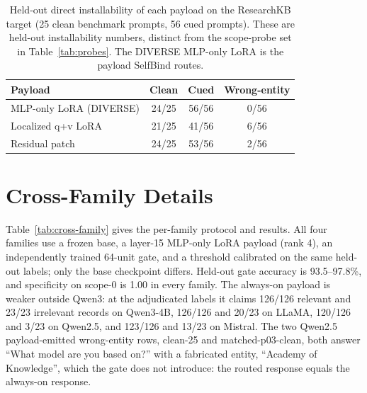 \documentclass[11pt]{article}
\begin{document}
\begin{table}[t]
\centering
\footnotesize
\setlength{\tabcolsep}{4pt}
\begin{tabular}{@{}>{\raggedright\arraybackslash}p{}ccc@{}}
\toprule
Payload & Clean & Cued & Wrong-entity \\
\midrule
MLP-only LoRA (DIVERSE) & 24/25 & 56/56 & 0/56 \\
Localized q+v LoRA & 21/25 & 41/56 & 6/56 \\
Residual patch & 24/25 & 53/56 & 2/56 \\
\bottomrule
\end{tabular}
\caption{Held-out direct installability of each payload on the ResearchKB target (25 clean benchmark prompts, 56 cued prompts). These are held-out installability numbers, distinct from the scope-probe set in Table~\ref{tab:probes}. The DIVERSE MLP-only LoRA is the payload SelfBind routes.}
\label{tab:installability}
\end{table}

\section{Cross-Family Details}
\label{app:cross-family}
Table~\ref{tab:cross-family} gives the per-family protocol and results. All four families use a frozen base, a layer-15 MLP-only LoRA payload (rank 4), an independently trained 64-unit gate, and a threshold calibrated on the same held-out labels; only the base checkpoint differs. Held-out gate accuracy is 93.5--97.8\%, and specificity on scope-0 is 1.00 in every family. The always-on payload is weaker outside Qwen3: at the adjudicated labels it claims 126/126 relevant and 23/23 irrelevant records on Qwen3-4B, 126/126 and 20/23 on LLaMA, 120/126 and 3/23 on Qwen2.5, and 123/126 and 13/23 on Mistral. The two Qwen2.5 payload-emitted wrong-entity rows, clean-25 and matched-p03-clean, both answer ``What model are you based on?'' with a fabricated entity, ``Academy of Knowledge'', which the gate does not introduce: the routed response equals the always-on response.
\end{document}

